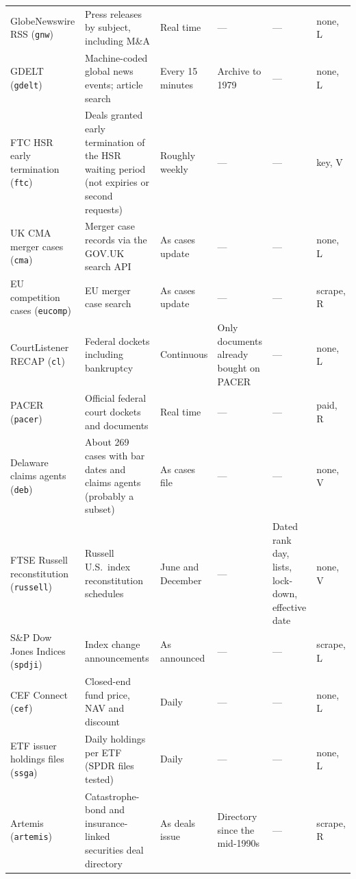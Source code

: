 \documentclass[10pt, a4paper, twocolumn]{article}
\newcommand{\sid}[1]{\texttt{\small #1}}   %
\newcommand{\ns}{---}                        %
\begin{document}
{\begin{longtable}{@{}L{3.1cm}L{4.65cm}L{1.85cm}L{2.5cm}L{2.7cm}L{1.35cm}@{}}
GlobeNewswire RSS (\sid{gnw}) & Press releases by subject, including M\&A & Real time & \ns & \ns & none, L \\
GDELT (\sid{gdelt}) & Machine-coded global news events; article search & Every 15 minutes & Archive to 1979 & \ns & none, L \\
FTC HSR early termination (\sid{ftc}) & Deals granted early termination of the HSR waiting period (not expiries or second requests) & Roughly weekly & \ns & \ns & key, V \\
UK CMA merger cases (\sid{cma}) & Merger case records via the GOV.UK search API & As cases update & \ns & \ns & none, L \\
EU competition cases (\sid{eucomp}) & EU merger case search & As cases update & \ns & \ns & scrape, R \\
CourtListener RECAP (\sid{cl}) & Federal dockets including bankruptcy & Continuous & Only documents already bought on PACER & \ns & none, L \\
PACER (\sid{pacer}) & Official federal court dockets and documents & Real time & \ns & \ns & paid, R \\
Delaware claims agents (\sid{deb}) & About 269 cases with bar dates and claims agents (probably a subset) & As cases file & \ns & \ns & none, V \\
FTSE Russell reconstitution (\sid{russell}) & Russell U.S.\ index reconstitution schedules & June and December & \ns & Dated rank day, lists, lock-down, effective date & none, V \\
S\&P Dow Jones Indices (\sid{spdji}) & Index change announcements & As announced & \ns & \ns & scrape, L \\
CEF Connect (\sid{cef}) & Closed-end fund price, NAV and discount & Daily & \ns & \ns & none, L \\
ETF issuer holdings files (\sid{ssga}) & Daily holdings per ETF (SPDR files tested) & Daily & \ns & \ns & none, L \\
Artemis (\sid{artemis}) & Catastrophe-bond and insurance-linked securities deal directory & As deals issue & Directory since the mid-1990s & \ns & scrape, R \\
\end{longtable}
}
\end{document}
